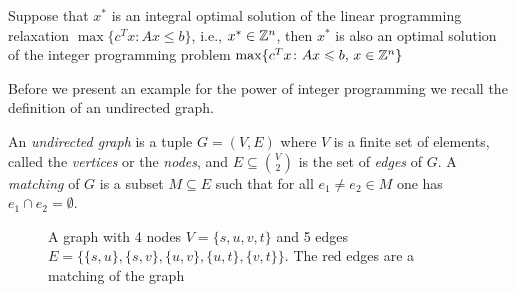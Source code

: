 \begin{theorem}
  \label{thr:14}
  Suppose that   $x^*$ is an integral  optimal solution of the  
  linear programming 
  relaxation $\max\{c^Tx \colon Ax\leq b\}$, i.e., $x^* \in
  \mathbb{Z}^n$, then $x^*$ is also an optimal solution of the integer
  programming problem $\max\{c^Tx \colon Ax\leqslant b, \, x \in \mathbb{Z}^n\}$
\end{theorem}

Before we present an example for the power of integer programming we
recall the definition of an undirected graph. 

\begin{definition} 
  An \emph{undirected graph} is a tuple $G = (V,E)$ where $V$ is a
  finite set of elements, called the \emph{vertices} or the \emph{nodes}, and $E\subseteq\binom{V}{2}$ is the
  set of \emph{edges} of $G$.  A \emph{matching} of $G$ is a subset
  $M\subseteq E$ such that for all $e_1\neq e_2\in M$ one has $e_1\cap e_2 = \emptyset$. 
\end{definition}








\begin{figure}
\begin{center}
\end{center}
  
  \caption{A graph with 4 nodes $V = \{s,u,v,t\}$ and 5 edges $E = \{
    \{s,u\}, \{s,v\}, \{u,v\}, \{u,t\},\{v,t\} \}$. The red edges
    are a matching of the graph}
\end{figure}



